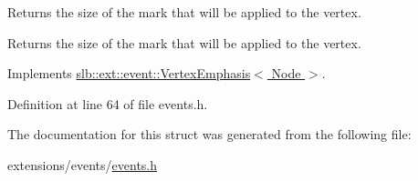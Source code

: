 Returns the size of the mark that will be applied to the vertex. 

\begin{DoxyReturn}{Returns}
the size of the mark that will be applied to the vertex. 
\end{DoxyReturn}


Implements \hyperlink{structslb_1_1ext_1_1event_1_1VertexEmphasis_ae474f58607e671c9da688e316178c29c}{slb\+::ext\+::event\+::\+Vertex\+Emphasis$<$ Node $>$}.



Definition at line 64 of file events.\+h.



The documentation for this struct was generated from the following file\+:\begin{DoxyCompactItemize}
\item 
extensions/events/\hyperlink{events_8h}{events.\+h}\end{DoxyCompactItemize}
